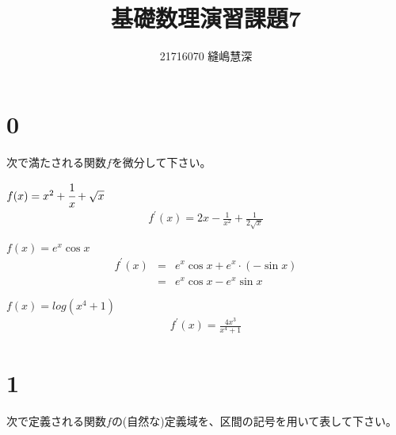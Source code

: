 \documentclass[fleqn]{jsarticle}
\title{基礎数理演習課題7}
\author{21716070 縫嶋慧深}
\begin{document}
	\maketitle

    \section*{0}
    次で満たされる関数$f$を微分して下さい。
    \begin{description}
		\setlength{\itemsep}{0.5cm}

            \item[(1)]
                $ f(x) = x^2 + \cfrac{1}{x} + \sqrt{x} $
                \begin{eqnarray*}
                    f^{\prime}(x) = 2x - \frac{1}{x^2} + \frac{1}{2\sqrt{x}}
                \end{eqnarray*}

            \item[(2)]
                $ f(x) = e^x\cos{x} $
                \begin{eqnarray*}
                    f^{\prime}(x) &=& e^x\cos{x} + e^x\cdot(-\sin{x}) \\
                    &=& e^x\cos{x} - e^x\sin{x}
                \end{eqnarray*}

            \item[(3)]
                $ f(x) = log(x^4 + 1) $
                \begin{eqnarray*}
                    f^{\prime}(x) = \frac{4x^3}{x^4 + 1}
                \end{eqnarray*}

    \end{description}

    \section*{1}
    次で定義される関数$f$の(自然な)定義域を、区間の記号を用いて表して下さい。
\end{document}
